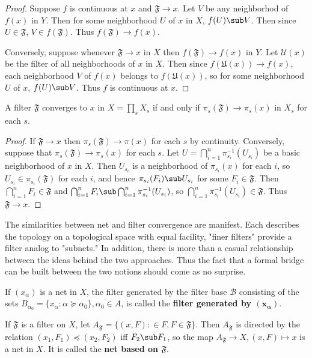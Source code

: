 \begin{proof}
Suppose $f$ is continuous at $x$ and $\mathfrak{F}\to x$. Let $V$ be any neighborhod of $f(x)$ in $Y$. Then for some neighborhood $U$ of $x$ in $X$, $f(U)\sub V$. Then since $U\in\mathfrak{F}$, $V\in f(\mathfrak{F})$. Thus $f(\mathfrak{F})\to f(x)$.\par
Conversely, suppose whenever $\mathfrak{F}\to x$ in $X$ then $f(\mathfrak{F})\to f(x)$ in $Y$. Let $\mathcal{U}(x)$ be the filter of all neighborhoods of $x$ in $X$. Then since $f(\mathfrak{U}(x))\to f(x)$, each neighborhood $V$ of $f(x)$ belongs to $f(\mathfrak{U}(x))$, so for some neighborhood $U$ of $x$, $f(U)\sub V$. Thus $f$ is continuous at $x$.
\end{proof}
\begin{proposition}
A filter $\mathfrak{F}$ converges to $x$ in $X=\prod_sX_s$ if and only if $\pi_s(\mathfrak{F})\to\pi_s(x)$ in $X_s$ for each $s$.
\end{proposition}
\begin{proof}
If $\mathfrak{F}\to x$ then $\pi_s(\mathfrak{F})\to\pi(x)$ for each $s$ by continuity. Conversely, suppose that $\pi_s(\mathfrak{F})\to\pi_s(x)$ for each $s$. Let $U=\bigcap_{i=1}^{n}\pi_{s_i}^{-1}(U_{s_i})$ be a basic neighborhood of $x$ in $X$. Then $U_{s_i}$ is a neighborhood of $\pi_{s_i}(x)$ for each $i$, so $U_{s_i}\in\pi_{s_i}(\mathfrak{F})$ for each $i$, and hence $\pi_{s_i}(F_i)\sub U_{s_i}$ for some $F_i\in\mathfrak{F}$. Then $\bigcap_{i=1}^{n}F_i\in\mathfrak{F}$ and $\bigcap_{i=1}^{n}F_i\sub\bigcap_{i=1}^{n}\pi^{-1}_{s_i}(U_{s_i})$, so $\bigcap_{i=1}^{n}\pi^{-1}_{s_i}(U_{s_i})\in\mathfrak{F}$. Thus $\mathfrak{F}\to x$.
\end{proof}
The similarities between net and filter convergence are manifest. Each describes the topology on a topological space with equal facility, "finer filters" provide a filter analog to "subnets." In addition, there is more than a casual relationship between the ideas behind the two approaches. Thus the fact that a formal bridge can be built between the two notions should come as no surprise.
\begin{definition}
If $(x_\alpha)$ is a net in $X$, the filter generated by the filter base $\mathcal{B}$ consisting of the sets $B_{\alpha_0}=\{x_\alpha:\alpha\succeq\alpha_0\},\alpha_0\in A$, is called the \textbf{filter generated by $\bm{(x_{\alpha})}$}.
\end{definition}
\begin{definition}
If $\mathfrak{F}$ is a filter on $X$, let $A_{\mathfrak{F}}=\{(x,F):\in F,F\in\mathfrak{F}\}$. Then $A_{\mathfrak{F}}$ is directed by the relation $(x_1,F_1)\preceq(x_2,F_2)$ iff $F_2\sub F_1$, so the map $A_{\mathfrak{F}}\to X,(x,F)\mapsto x$ is a net in $X$. It is called the \textbf{net based on $\mathfrak{F}$}.
\end{definition}
